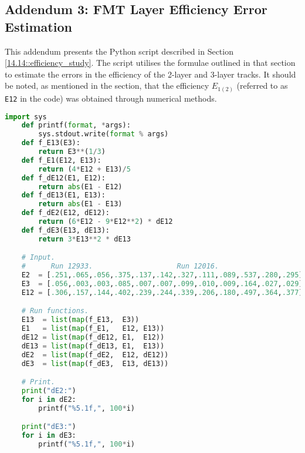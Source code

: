 \subsection*{Addendum 3: FMT Layer Efficiency Error Estimation}
\label{20.03::fmt_layer_efficiency_error_estimation}
    This addendum presents the Python script described in Section \ref{14.14::efficiency_study}.
    The script utilises the formulae outlined in that section to estimate the errors in the efficiency of the 2-layer and 3-layer tracks.
    It should be noted, as mentioned in the section, that the efficiency $E_{1(2)}$ (referred to as \verb|E12| in the code) was obtained through numerical methods.

    \begin{lstlisting}[language=Python]
    import sys
    def printf(format, *args):
        sys.stdout.write(format % args)
    def f_E13(E3):
        return E3**(1/3)
    def f_E1(E12, E13):
        return (4*E12 + E13)/5
    def f_dE12(E1, E12):
        return abs(E1 - E12)
    def f_dE13(E1, E13):
        return abs(E1 - E13)
    def f_dE2(E12, dE12):
        return (6*E12 - 9*E12**2) * dE12
    def f_dE3(E13, dE13):
        return 3*E13**2 * dE13

    # Input.
    #      Run 12933.                    Run 12016.
    E2  = [.251,.065,.056,.375,.137,.142,.327,.111,.089,.537,.280,.295]
    E3  = [.056,.003,.003,.085,.007,.007,.099,.010,.009,.164,.027,.029]
    E12 = [.306,.157,.144,.402,.239,.244,.339,.206,.180,.497,.364,.377]

    # Run functions.
    E13  = list(map(f_E13,  E3))
    E1   = list(map(f_E1,   E12, E13))
    dE12 = list(map(f_dE12, E1,  E12))
    dE13 = list(map(f_dE13, E1,  E13))
    dE2  = list(map(f_dE2,  E12, dE12))
    dE3  = list(map(f_dE3,  E13, dE13))

    # Print.
    print("dE2:")
    for i in dE2:
        printf("%5.1f,", 100*i)

    print("dE3:")
    for i in dE3:
        printf("%5.1f,", 100*i)
    \end{lstlisting}

    \pagebreak
